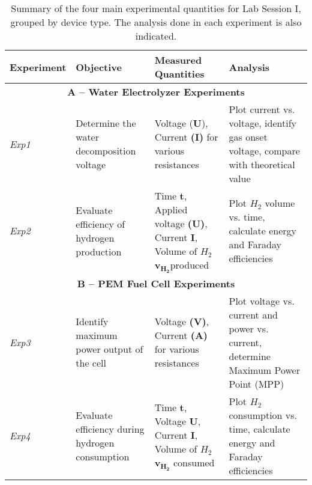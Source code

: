 \begin{table}[H]
    \centering
    \caption{Summary of the four main experimental quantities for Lab Session I, grouped by device type. The analysis done in each experiment is also indicated.}
    \renewcommand{\arraystretch}{2} %
    \setlength{\tabcolsep}{6pt} %
    \begin{tabular}{|p{2cm}|p{4cm}|p{4cm}|p{4cm}|}
        \hline
        \textbf{Experiment} & \textbf{Objective} & \textbf{Measured Quantities} & \textbf{Analysis} \\
        \hline
        \multicolumn{4}{|c|}{\textbf{A – Water Electrolyzer Experiments}} \\
        \hline
        \textit{Exp1} & Determine the water decomposition voltage & Voltage (\textbf{U}), Current \textbf{(I)} for various resistances & Plot {current} vs. {voltage}, identify gas onset voltage, compare with theoretical value \\
        \hline
        \textit{Exp2} & Evaluate efficiency of hydrogen production & Time \textbf{t}, Applied voltage \textbf{(U)}, Current \textbf{I}, Volume of ${H_2}$ $\mathbf{v_{H_2}} $produced & Plot $H_2$ volume vs. time, calculate energy and Faraday efficiencies \\
        \hline
        \multicolumn{4}{|c|}{\textbf{B – PEM Fuel Cell Experiments}} \\
        \hline
        \textit{Exp3} & Identify maximum power output of the cell & Voltage \textbf{ (V)}, Current \textbf{ (A)} for various resistances & Plot {voltage} vs. {current} and {power} vs. {current}, determine Maximum Power Point (MPP) \\
        \hline
        \textit{Exp4} & Evaluate efficiency during hydrogen consumption & Time \textbf{t}, Voltage \textbf{U}, Current \textbf{I}, Volume of ${H_2}$ $\mathbf{v_{H_2}}$ consumed & Plot ${H_2}$ consumption vs. time, calculate energy and Faraday efficiencies \\
        \hline
    \end{tabular}
    \vspace{0.5em}
    
    \label{tab:experimental_summary} %
\end{table}

